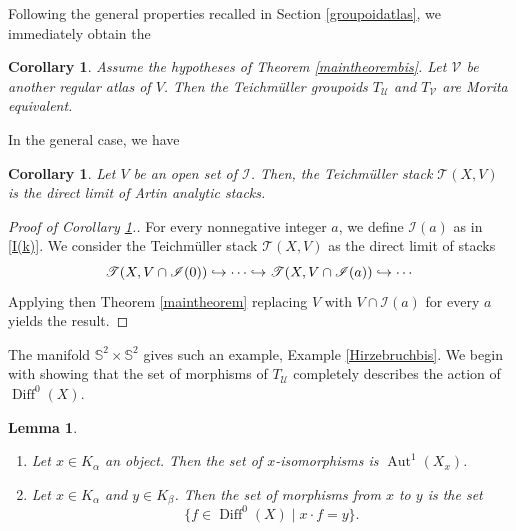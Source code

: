 \documentclass[JEP,XML,SOM,Unicode]{cedram}
\let\mathcal\mathscr
\def\hto{\mathrel{\lhook\joinrel\to}}
\DeclareMathOperator{\Aut}{Aut}
\DeclareMathOperator{\Diff}{Diff}
\theoremstyle{plain}
\newtheorem{corollary}[theorem]{Corollary}
\newtheorem{lemma}[theorem]{Lemma}
\theoremstyle{definition}
\theoremstyle{remark}
\numberwithin{equation}{section}
\newcommand{\cI}{\mathcal{I}}
\begin{document}
Following the general properties recalled in Section \ref{groupoidatlas}, we immediately obtain the

\begin{corollary}
\label{TeichMoritaind}
Assume the hypotheses of Theorem \ref{maintheorembis}. Let $\mathcal V$ be another regular atlas of $V$. Then the Teichmüller groupoids $T_\mathcal U$ and $T_\mathcal V$ are Morita equivalent.
\end{corollary}

In the general case, we have

\begin{corollary}
\label{maincorollary}
Let $V$ be an open set of $\cI$. Then, the Teichmüller stack $\mathcal T(X,V)$ is the direct limit of Artin analytic stacks.
\end{corollary}

\begin{proof}[Proof of Corollary \ref{maincorollary}.]
For every nonnegative integer $a$, we define $\cI(a)$ as in \eqref{I(k)}. We consider the Teichmüller stack $\mathcal T(X,V)$ as the direct limit of stacks
\begin{equation}
\label{directlimit}
\mathcal T(X,V\cap \cI(0))\hto \cdots\hto \mathcal T(X,V\cap \cI(a))\hto \cdots
\end{equation}
Applying then Theorem \ref{maintheorem} replacing $V$ with $V\cap \cI(a)$ for every $a$ yields the result.
\end{proof}

The manifold $\mathbb S^2\times \mathbb S^2$ gives such an example, \cf Example \ref{Hirzebruchbis}. We begin with showing that the set of morphisms of $T_{\mathcal{U}}$ completely describes the action of $\Diff^0(X)$.

\skpt
\begin{lemma}
\label{isoteich}
\begin{enumerate}
\item\label{isoteich1}
Let $x\in K_\alpha$ an object. Then the set of $x$-isomorphisms is $\Aut^1(X_x)$.
\item\label{isoteich2}
Let $x\in K_\alpha$ and $y\in K_\beta$. Then the set of morphisms from $x$ to $y$ is the set
\begin{equation}
\label{morphismsxy}
\{f\in\Diff^0(X)\mid x\cdot f=y\}.
\end{equation}
\end{enumerate}
\end{lemma}
\end{document}
